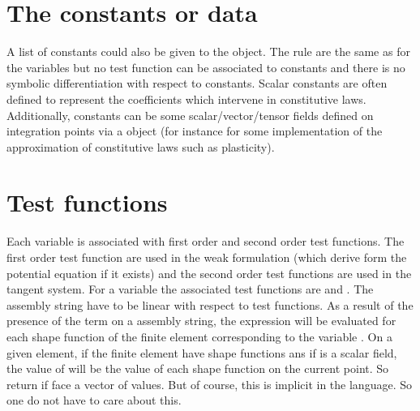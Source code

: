 \documentclass[a4paper,11pt,english]{sphinxmanual}
\begin{document}
\section{The constants or data}
\label{\detokenize{userdoc/gasm_high:the-constants-or-data}}
A list of constants could also be given to the  object. The rule are the same as for the variables but no test function can be associated to constants and there is no symbolic differentiation with respect to constants. Scalar constants are often defined to represent the coefficients which intervene in constitutive laws. Additionally, constants can be some scalar/vector/tensor fields defined on integration points via a  object (for instance for some implementation of the approximation of constitutive laws such as plasticity).


\section{Test functions}
\label{\detokenize{userdoc/gasm_high:test-functions}}
Each variable is associated with first order and second order test functions.
The first order test function are used in the weak formulation (which derive form the potential equation if it exists) and the second order test functions are used in the tangent system. For a variable  the associated test functions are  and . The assembly string have to be linear with respect to test functions. As a result of the presence of the term  on a assembly string, the expression will be evaluated for each shape function of the finite element corresponding to the variable . On a given element, if the finite element have  shape functions ans if  is a scalar field, the value of  will be the value of each shape function on the current point. So  return if face a vector of  values. But of course, this is implicit in the language. So one do not have to care about this.
\end{document}
